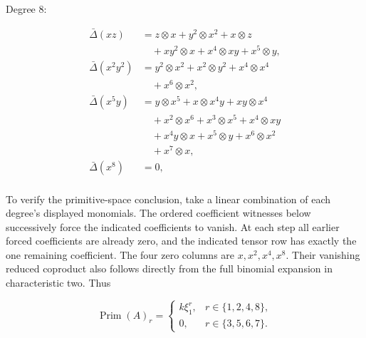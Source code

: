 Degree 8:

\[
\begin{aligned}
\bar\Delta(xz)&=z\otimes x+y^{2}\otimes x^{2}+x\otimes z\\
&\quad+xy^{2}\otimes x+x^{4}\otimes xy+x^{5}\otimes y,\\
\bar\Delta(x^{2}y^{2})&=y^{2}\otimes x^{2}+x^{2}\otimes y^{2}+x^{4}\otimes x^{4}\\
&\quad+x^{6}\otimes x^{2},\\
\bar\Delta(x^{5}y)&=y\otimes x^{5}+x\otimes x^{4}y+xy\otimes x^{4}\\
&\quad+x^{2}\otimes x^{6}+x^{3}\otimes x^{5}+x^{4}\otimes xy\\
&\quad+x^{4}y\otimes x+x^{5}\otimes y+x^{6}\otimes x^{2}\\
&\quad+x^{7}\otimes x,\\
\bar\Delta(x^{8})&=0,\\
\end{aligned}
\]

To verify the primitive-space conclusion, take a linear combination of each degree's displayed monomials. The ordered coefficient witnesses below successively force the indicated coefficients to vanish. At each step all earlier forced coefficients are already zero, and the indicated tensor row has exactly the one remaining coefficient. The four zero columns are \(x,x^2,x^4,x^8\). Their vanishing reduced coproduct also follows directly from the full binomial expansion in characteristic two. Thus

\begin{equation}
\operatorname{Prim}(A)_r=
\begin{cases}k\xi_1^r,&r\in\{1,2,4,8\},\\
0,&r\in\{3,5,6,7\}.
\end{cases}
\label{courseIII:the-actual-mod-two-cooperation-comparison-through-degree-eight:eq:7.1}
\end{equation}

